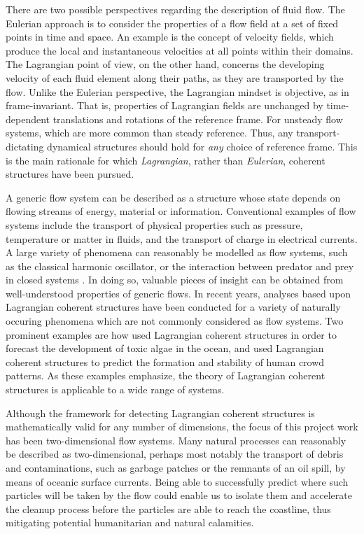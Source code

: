 There are two possible perspectives regarding the description of fluid flow.
The Eulerian approach is to consider the properties of a flow field at a set of
fixed points in time and space. An example is the concept of velocity fields,
which produce the local and instantaneous velocities at all points within their
domains. The Lagrangian point of view, on the other hand, concerns the
developing velocity of each fluid element along their paths, as they are
transported by the flow. Unlike the Eulerian perspective, the Lagrangian
mindset is objective, as in frame-invariant. That is, properties of Lagrangian
fields are unchanged by time-dependent translations and rotations of the
reference frame. For unsteady flow systems, which are more common than steady
reference. Thus, any transport-dictating dynamical structures should
hold for \emph{any} choice of reference frame. This is the main
rationale for which \emph{Lagrangian}, rather than \emph{Eulerian}, coherent
structures have been pursued.

A generic flow system can be described as a structure whose state depends on
flowing streams of energy, material or information. Conventional examples of
flow systems include the transport of physical properties such as pressure,
temperature or matter in fluids, and the transport of charge in electrical
currents. A large variety of phenomena can reasonably be modelled as flow
systems, such as the classical harmonic oscillator, or the interaction between
predator and prey in closed systems
\parencite[parts I--II]{strogatz2014nonlinear}. In doing so, valuable pieces
of insight can be obtained from well-understood properties of generic flows.
In recent years, analyses based upon Lagrangian coherent structures have been
conducted for a variety of naturally occuring phenomena which are not
commonly considered as flow systems. Two prominent examples are how
\textcite{olascoaga2008tracing} used Lagrangian coherent structures in order
to forecast the development of toxic algae in the ocean, and
\textcite{ali2007lagrangian} used Lagrangian coherent structures to predict
the formation and stability of human crowd patterns. As these examples
emphasize, the theory of Lagrangian coherent structures is applicable to a
wide range of systems.

Although the framework for detecting Lagrangian coherent structures is
mathematically valid for any number of dimensions, the focus of this project
work has been two-dimensional flow systems. Many natural processes can
reasonably be described as two-dimensional, perhaps most notably the transport
of debris and contaminations, such as garbage patches or the remnants of
an oil spill, by means of oceanic surface currents. Being able to successfully
predict where such particles will be taken by the flow could enable us to
isolate them and accelerate the cleanup process before the particles are able
to reach the coastline, thus mitigating potential humanitarian and natural
calamities.

